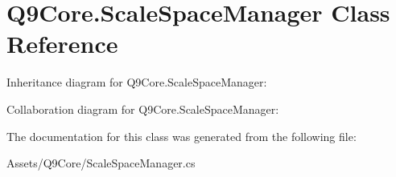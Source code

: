 \hypertarget{class_q9_core_1_1_scale_space_manager}{}\section{Q9\+Core.\+Scale\+Space\+Manager Class Reference}
\label{class_q9_core_1_1_scale_space_manager}


Inheritance diagram for Q9\+Core.\+Scale\+Space\+Manager\+:


Collaboration diagram for Q9\+Core.\+Scale\+Space\+Manager\+:


The documentation for this class was generated from the following file\+:\begin{DoxyCompactItemize}
\item 
Assets/\+Q9\+Core/Scale\+Space\+Manager.\+cs\end{DoxyCompactItemize}
